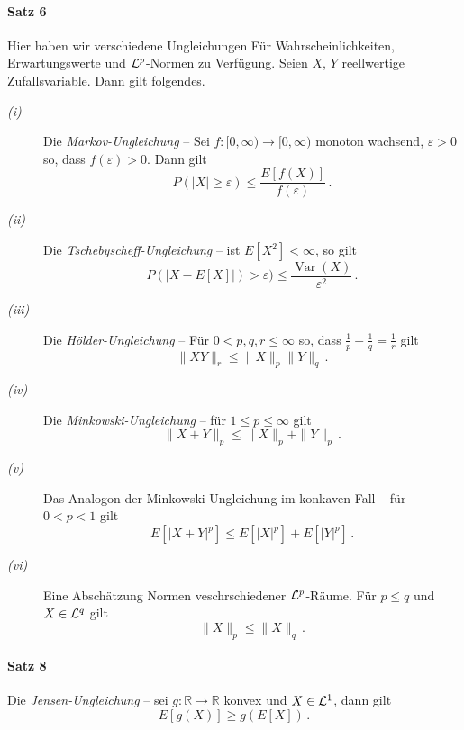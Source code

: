 \documentclass{article}
\begin{document}
\paragraph{Satz 6} Hier haben wir verschiedene Ungleichungen Für Wahrscheinlichkeiten, Erwartungswerte und ${\cal L}^p$-Normen zu Verfügung.
Seien $X$, $Y$ reellwertige Zufallsvariable.
Dann gilt folgendes.
\begin{description}
\item[\emph{(i)}] Die \emph{Markov-Ungleichung} -- Sei $f\colon[0,\infty)\to[0,\infty)$ monoton wachsend, $\varepsilon>0$ so, dass $f(\varepsilon)>0$.
  Dann gilt
  \[P(|X|\geq\varepsilon)\leq\frac{E[f(X)]}{f(\varepsilon)}\,.\]
\item[\emph{(ii)}] Die \emph{Tschebyscheff-Ungleichung} -- ist $E[X^2]<\infty$, so gilt
  \[P(|X-E[X]|)>\varepsilon)\leq\frac{\operatorname{Var}(X)}{\varepsilon^2}\,.\]
\item[\emph{(iii)}] Die \emph{Hölder-Ungleichung} -- Für $0<p,q,r\leq\infty$ so, dass $\frac{1}{p}+\frac{1}{q}=\frac{1}{r}$ gilt
  \[\|XY\|_r\leq\|X\|_p\|Y\|_q\,.\]
\item[\emph{(iv)}] Die \emph{Minkowski-Ungleichung} -- für $1\leq p\leq\infty$ gilt
  \[\|X+Y\|_p\leq\|X\|_p+\|Y\|_p\,.\]
\item[\emph{(v)}] Das Analogon der Minkowski-Ungleichung im konkaven Fall -- für $0<p<1$ gilt
  \[E[|X+Y|^p]\leq E[|X|^p]+E[|Y|^p]\,.\]
\item[\emph{(vi)}] Eine Abschätzung Normen veschrschiedener ${\cal L}^p$-Räume. Für $p\leq q$ und $X\in{\cal L}^q$ gilt
  \[\|X\|_p\leq\|X\|_q\,.\]
\end{description}
\paragraph{Satz 8} Die \emph{Jensen-Ungleichung} -- sei $g\colon\mathbb{R}\to\mathbb{R}$ konvex und $X\in{\cal L}^1$, dann gilt
\[E[g(X)]\geq g(E[X])\,.\]
\end{document}
